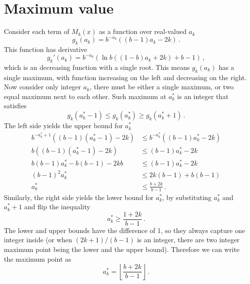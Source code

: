 \documentclass[]{article}
\begin{document}
\section{Maximum value}

Consider each term of $M_k(x)$ as a function over real-valued $a_k$
\[
g_k(a_k) =  b^{-a_k}((b-1)a_k-2k)\,.
\]
This function has derivative
\[
g_k'(a_k) =  b^{-a_k}(\ln b((1-b)a_k+2k)+b-1)\,,
\]
which is an decreasing function with a single root. This means $g_k(a_k)$ has a single maximum, with function increasing on the left and decreasing on the right. Now consider only integer $a_k$, there must be either a single maximum, or two equal maximum next to each other. Such maximum at $a_k^*$ is an integer that satisfies
\[
g_k(a_k^* - 1)\le g_k(a_k^*)\ge g_k(a_k^* + 1)\,.
\] 
The left side yields the upper bound for $a_k^*$
\begin{align*}
b^{-a_k^* + 1}((b-1)(a_k^* - 1)-2k)&\le b^{-a_k^*}((b-1)a_k^*-2k) \\
b((b-1)(a_k^* - 1)-2k)&\le (b-1)a_k^*-2k\\
b(b-1)a_k^* - b(b-1)-2kb&\le (b-1)a_k^*-2k\\
(b-1)^2a_k^*&\le 2k(b-1) + b(b-1)\\
a_k^* &\le \frac{ b+2k}{b-1}\,.
\end{align*}
Similarly, the right side yields the lower bound for $a_k^*$, by substituting $a_k^*$ and $a_k^* + 1$ and flip the inequality
\[
a_k^* \ge \frac{1+2k}{b-1}\,.
\]
The lower and upper bounds have the difference of 1, so they always capture one integer inside (or when $(2k +1)/(b-1)$ is an integer, there are two integer maximum point being the lower and the upper bound). Therefore we can write the maximum point as
\[
a_k^* = \left\lfloor\frac{b+2k}{b-1}\right\rfloor\,.
\]
\end{document}
